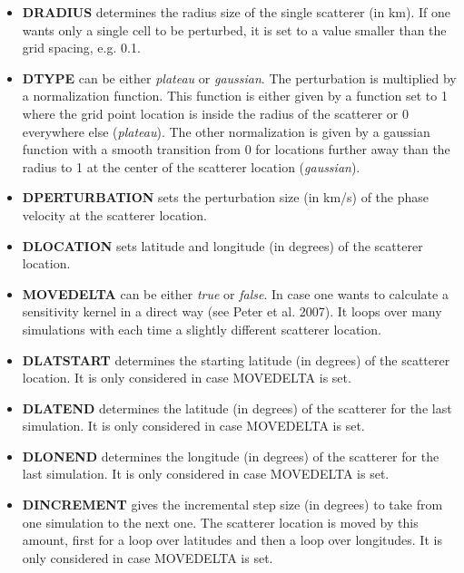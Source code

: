 \documentclass[a4paper,
                          headsepline,
                          listof=totoc,
                          toc=listof,
                          headings=small]{scrreprt} %
\begin{document}
\begin{itemize}
\item \textbf{DRADIUS} 
determines the radius size of the single scatterer (in km). If one wants only a single cell
to be perturbed, it is set to a value smaller than the grid spacing, e.g. 0.1.

\item \textbf{DTYPE} 
can be either \textit{plateau} or \textit{gaussian}. The perturbation is multiplied by 
a normalization function. This function is either given by
a function set to 1 where the grid point location is inside the radius of the scatterer 
or 0 everywhere else (\textit{plateau}). The other normalization is given by a gaussian function with a smooth transition from 0 for locations further away
than the radius to 1 at the center of the scatterer location (\textit{gaussian}).

\item \textbf{DPERTURBATION} 
sets the perturbation size (in km/s) of the phase velocity at the scatterer location.

\item \textbf{DLOCATION} 
sets latitude and longitude (in degrees) of the scatterer location.


\item \textbf{MOVEDELTA} 
can be either \textit{true} or \textit{false}. In case one wants to calculate a sensitivity kernel
in a direct way (see Peter et al. 2007). It loops over many simulations
with each time a slightly different scatterer location.

\item \textbf{DLATSTART} 
determines the starting latitude (in degrees) of the scatterer location. It is only 
considered in case MOVEDELTA is set.

\item \textbf{DLATEND} 
determines the latitude (in degrees) of the scatterer for the last simulation. It is only considered in case MOVEDELTA is set.

\item \textbf{DLONEND} 
determines the longitude (in degrees) of the scatterer for the last simulation. It is
only considered in case MOVEDELTA is set.

\item \textbf{DINCREMENT} 
gives the incremental step size (in degrees) to take from one simulation 
to the next one. The scatterer location is moved by this amount, first for a 
loop over latitudes and then a loop over longitudes. It is only considered in case MOVEDELTA is set.


\end{itemize}
\end{document}
